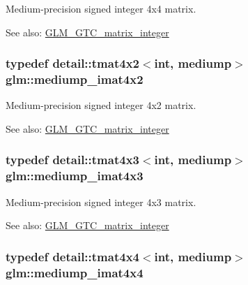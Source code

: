 Medium-precision signed integer 4x4 matrix. \begin{Desc}
\item[See also:]\hyperlink{group__gtc__matrix__integer}{GLM\_\-GTC\_\-matrix\_\-integer} \end{Desc}
\hypertarget{group__gtc__matrix__integer_gcdae7d6ae4820756c62c2b5fd5c0370a}{
\subsubsection[mediump\_\-imat4x2]{\setlength{\rightskip}{0pt plus 5cm}typedef detail::tmat4x2$<$int, mediump$>$ {\bf glm::mediump\_\-imat4x2}}}
\label{group__gtc__matrix__integer_gcdae7d6ae4820756c62c2b5fd5c0370a}


Medium-precision signed integer 4x2 matrix. \begin{Desc}
\item[See also:]\hyperlink{group__gtc__matrix__integer}{GLM\_\-GTC\_\-matrix\_\-integer} \end{Desc}
\hypertarget{group__gtc__matrix__integer_g5032ee978a55aa0db4842d5c3cbeade0}{
\subsubsection[mediump\_\-imat4x3]{\setlength{\rightskip}{0pt plus 5cm}typedef detail::tmat4x3$<$int, mediump$>$ {\bf glm::mediump\_\-imat4x3}}}
\label{group__gtc__matrix__integer_g5032ee978a55aa0db4842d5c3cbeade0}


Medium-precision signed integer 4x3 matrix. \begin{Desc}
\item[See also:]\hyperlink{group__gtc__matrix__integer}{GLM\_\-GTC\_\-matrix\_\-integer} \end{Desc}
\hypertarget{group__gtc__matrix__integer_gfa2df6be3aad055867b9bfea34e9c4a0}{
\subsubsection[mediump\_\-imat4x4]{\setlength{\rightskip}{0pt plus 5cm}typedef detail::tmat4x4$<$int, mediump$>$ {\bf glm::mediump\_\-imat4x4}}}
\label{group__gtc__matrix__integer_gfa2df6be3aad055867b9bfea34e9c4a0}


